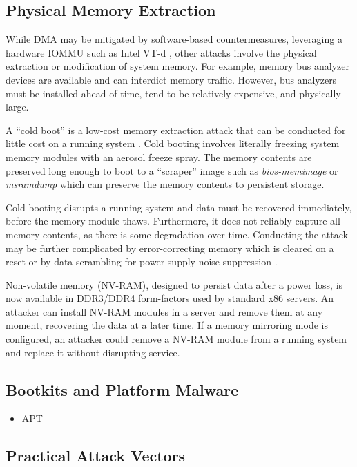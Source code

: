 \subsection{Physical Memory Extraction}

While DMA may be mitigated by software-based countermeasures,
leveraging a hardware IOMMU such as
Intel VT-d \cite{Intel-IOMMU:2013}, other attacks involve the physical
extraction or modification of system memory. For example, memory bus
analyzer devices are available and can interdict memory
traffic. However, bus analyzers must be installed ahead of time, tend
to be relatively expensive, and physically large.

A ``cold boot'' is a low-cost memory extraction attack that can be
conducted for little cost on a running system
\cite{Halderman:2008tp}. Cold booting involves literally freezing
system memory modules with an aerosol freeze spray. The memory
contents are preserved long enough to boot to a ``scraper'' image such
as {\em bios-memimage} or {\em msramdump} which can preserve the
memory contents to persistent storage.

Cold booting disrupts a running system and data must be recovered
immediately, before the memory module thaws. Furthermore, it does not
reliably capture all memory contents, as there is some degradation
over time. Conducting the attack may be further complicated by
error-correcting memory which is cleared on a reset or by data
scrambling for power supply noise suppression \cite{Mozak:2011lfsr}.

Non-volatile memory (NV-RAM), designed to persist data after a power
loss, is now available in DDR3/DDR4 form-factors used by standard x86
servers. An attacker can install NV-RAM modules in a server and remove
them at any moment, recovering the data at a later time. If a memory
mirroring mode is configured, an attacker could remove a NV-RAM module
from a running system and replace it without disrupting service.


\subsection{Bootkits and Platform Malware}

\begin{itemize}
  \item APT
\end{itemize}

\subsection{Practical Attack Vectors}

